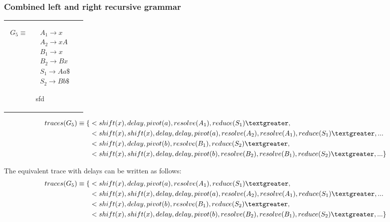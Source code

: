 \documentclass[11pt]{article}
\begin{document}
\subsubsection{Combined left and right recursive grammar}
\begin{tabular}[t]{cl}
\parbox{.3\textwidth}{
\begin{align*}
G_5 \equiv \quad & A_1 \rightarrow x\\
                 & A_2 \rightarrow x A\\
                 & B_1 \rightarrow x\\
                 & B_2 \rightarrow B x\\
                 & S_1 \rightarrow A a \$\\
                 & S_2 \rightarrow B b \$
\end{align*}}
\parbox{.8\textwidth}{sfd}
\end{tabular}

\begin{align*}
traces(G_5) \equiv \{ & \textless shift(x), delay, pivot(a), resolve(A_1), reduce(S_1) \textgreater,\\
                      & \textless shift(x), shift(x), delay, delay, pivot(a), resolve(A_2), resolve(A_1), reduce(S_1) \textgreater, ... \\
                      & \textless shift(x), delay, pivot(b), resolve(B_1), reduce(S_2) \textgreater,\\
                      & \textless shift(x), shift(x), delay, delay, pivot(b), resolve(B_2), resolve(B_1), reduce(S_2) \textgreater, ... \}
\end{align*}

The equivalent trace with delays can be written as follows:
\begin{align*}
traces(G_5) \equiv \{ & \textless shift(x), delay, pivot(a), resolve(A_1), reduce(S_1) \textgreater,\\
                      & \textless shift(x), shift(x), delay, delay, pivot(a), resolve(A_2), resolve(A_1), reduce(S_1) \textgreater, ... \\
                      & \textless shift(x), delay, pivot(b), resolve(B_1), reduce(S_2) \textgreater,\\
                      & \textless shift(x), shift(x), delay, delay, pivot(b), resolve(B_2), resolve(B_1), reduce(S_2) \textgreater, ... \}
\end{align*}

\end{document}
